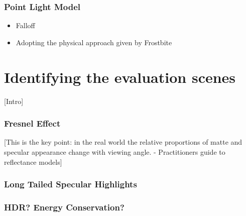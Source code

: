 \subsubsection{Point Light Model}

\begin{itemize}
	\item Falloff
	\item Adopting the physical approach given by Frostbite
\end{itemize}

\section{Identifying the evaluation scenes}

[Intro]

\subsubsection{Fresnel Effect}

[This is the key point: in the real world the relative proportions of matte and specular appearance change with viewing
angle. - Practitioners guide to reflectance models]

\subsubsection{Long Tailed Specular Highlights}

\subsubsection{HDR? Energy Conservation?}
